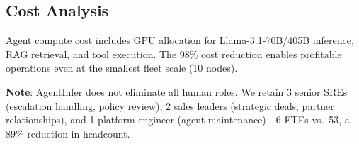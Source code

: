 \documentclass[conference,10pt,letterpaper]{IEEEtran}
\begin{document}
\subsection{Cost Analysis}

\begin{table}[!t]
\caption{Annual Cost Comparison: Human vs.\ AgentInfer}
\label{tab:cost}
\centering\scriptsize
{}
\end{table}

Agent compute cost includes GPU allocation for Llama-3.1-70B/405B inference, RAG retrieval, and tool execution. The 98\% cost reduction enables profitable operations even at the smallest fleet scale (10 nodes).

\textbf{Note}: AgentInfer does not eliminate all human roles. We retain 3 senior SREs (escalation handling, policy review), 2 sales leaders (strategic deals, partner relationships), and 1 platform engineer (agent maintenance)---6 FTEs vs.\ 53, a 89\% reduction in headcount.
\end{document}
